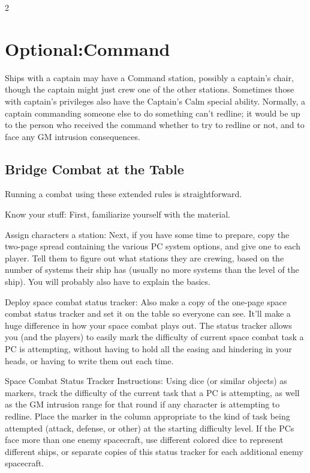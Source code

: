 \begin{multicols}{2}

\section{Optional:Command}

Ships with a captain may have a Command station, possibly a captain’s chair, though the captain might just crew one of the other stations. Sometimes those with captain’s privileges also have the Captain’s Calm special ability. Normally, a captain commanding someone else to do something can’t redline; it would be up to the person who received the command whether to try to redline or not, and to face any GM intrusion consequences.

\subsection{Bridge Combat at the Table}

Running a combat using these extended rules is straightforward. 

Know your stuff: First, familiarize yourself with the material. 

Assign characters a station: Next, if you have some time to prepare, copy the two-page spread containing the various PC system options, and give one to each player. Tell them to figure out what stations they are crewing, based on the number of systems their ship has (usually no more systems than the level of the ship). You will probably also have to explain the basics.

Deploy space combat status tracker: Also make a copy of the one-page space combat status tracker and set it on the table so everyone can see. It’ll make a huge difference in how your space combat plays out. The status tracker allows you (and the players) to easily mark the difficulty of current space combat task a PC is attempting, without having to hold all the easing and hindering in your heads, or having to write them out each time. 

Space Combat Status Tracker Instructions: Using dice (or similar objects) as markers, track the difficulty of the current task that a PC is attempting, as well as the GM intrusion range for that round if any character is attempting to redline. Place the marker in the column appropriate to the kind of task being attempted (attack, defense, or other) at the starting difficulty level. If the PCs face more than one enemy spacecraft, use different colored dice to represent different ships, or separate copies of this status tracker for each additional enemy spacecraft. 


\end{multicols}
